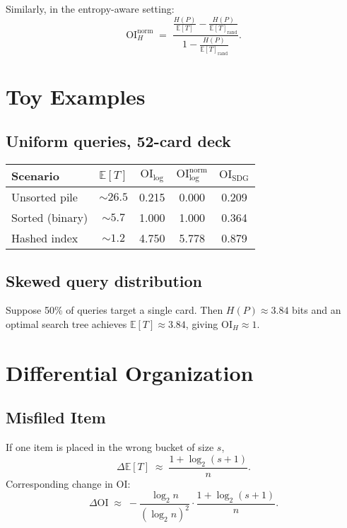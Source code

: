 \documentclass[11pt]{article}
\begin{document}
Similarly, in the entropy-aware setting:
\[
\mathrm{OI}^{\mathrm{norm}}_H \;=\;
\frac{\tfrac{H(P)}{\mathbb{E}[T]} - \tfrac{H(P)}{\mathbb{E}[T]_{\mathrm{rand}}}}
{1 - \tfrac{H(P)}{\mathbb{E}[T]_{\mathrm{rand}}}}.
\]


\section{Toy Examples}
\subsection{Uniform queries, 52-card deck}
\begin{center}
\begin{tabular}{lcccc}
\toprule
Scenario & $\mathbb{E}[T]$ & $\mathrm{OI}_{\log}$ & $\mathrm{OI}^{\text{norm}}_{\log}$ & $\mathrm{OI}_{\text{SDG}}$ \\
\midrule
Unsorted pile   & $\sim26.5$ & 0.215 & 0.000 & 0.209 \\
Sorted (binary) & $\sim5.7$  & 1.000 & 1.000 & 0.364 \\
Hashed index    & $\sim1.2$  & 4.750 & 5.778 & 0.879 \\
\bottomrule
\end{tabular}
\end{center}


\subsection{Skewed query distribution}
Suppose 50\% of queries target a single card. Then
$H(P)\approx 3.84$ bits and an optimal search tree achieves
$\mathbb{E}[T]\approx 3.84$, giving $\mathrm{OI}_H\approx 1$.

\section{Differential Organization}
\subsection{Misfiled Item}
If one item is placed in the wrong bucket of size $s$,
\[
\Delta \mathbb{E}[T] \;\approx\; \frac{1+\log_2(s+1)}{n}.
\]
Corresponding change in OI:
\[
\Delta \mathrm{OI} \;\approx\;
-\frac{\log_2 n}{(\log_2 n)^2}\cdot \frac{1+\log_2(s+1)}{n}.
\]
\end{document}
